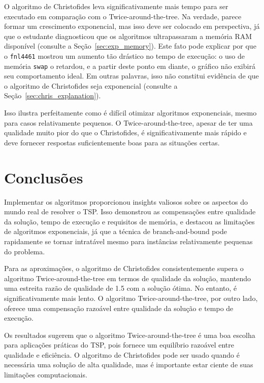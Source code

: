 O algoritmo de Christofides leva significativamente mais tempo para ser executado em comparação com o Twice-around-the-tree. Na verdade, parece formar um crescimento exponencial, mas isso deve ser colocado em perspectiva, já que o estudante diagnosticou que os algoritmos ultrapassaram a memória RAM disponível (consulte a Seção~\ref{sec:exp_memory}). Este fato pode explicar por que o \texttt{fnl4461} mostrou um aumento tão drástico no tempo de execução: o uso de memória \texttt{swap} o retardou, e a partir deste ponto em diante, o gráfico não exibirá seu comportamento ideal. Em outras palavras, isso não constitui evidência de que o algoritmo de Christofides seja exponencial (consulte a Seção~\ref{sec:chris_explanation}).

Isso ilustra perfeitamente como é difícil otimizar algoritmos exponenciais, mesmo para casos relativamente pequenos. O Twice-around-the-tree, apesar de ter uma qualidade muito pior do que o Christofides, é significativamente mais rápido e deve fornecer respostas suficientemente boas para as situações certas.

\section{Conclusões} \label{sec:conclusions}

Implementar os algoritmos proporcionou insights valiosos sobre os aspectos do mundo real de resolver o TSP. Isso demonstrou as compensações entre qualidade da solução, tempo de execução e requisitos de memória, e destacou as limitações de algoritmos exponenciais, já que a técnica de branch-and-bound pode rapidamente se tornar intratável mesmo para instâncias relativamente pequenas do problema.

Para as aproximações, o algoritmo de Christofides consistentemente supera o algoritmo Twice-around-the-tree em termos de qualidade da solução, mantendo uma estreita razão de qualidade de 1.5 com a solução ótima. No entanto, é significativamente mais lento. O algoritmo Twice-around-the-tree, por outro lado, oferece uma compensação razoável entre qualidade da solução e tempo de execução.

Os resultados sugerem que o algoritmo Twice-around-the-tree é uma boa escolha para aplicações práticas do TSP, pois fornece um equilíbrio razoável entre qualidade e eficiência. O algoritmo de Christofides pode ser usado quando é necessária uma solução de alta qualidade, mas é importante estar ciente de suas limitações computacionais.




